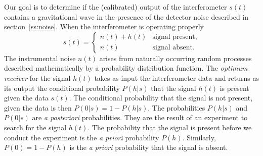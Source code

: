 Our goal is to determine if the (calibrated) output of the interferometer
$s(t)$ contains a gravitational wave in the presence of the detector noise
described in section~\ref{ss:noise}. When the interferometer is operating
properly
\begin{equation}
s(t) = \begin{cases}
n(t) + h(t) & \text{signal present},\\
n(t) & \text{signal absent}.
\end{cases}
\end{equation}
The instrumental noise $n(t)$ arises from naturally occurring random processes
described mathematically by a probability distribution function. The
\emph{optimum receiver} for the signal $h(t)$ takes as input the
interferometer data and returns as its output the conditional probability
$P(h|s)$ that the signal $h(t)$ is present given the data $s(t)$. The
conditional probability that the signal is not present, given the data is then
$P(0|s) = 1 - P(h|s)$. The probabilities $P(h|s)$ and $P(0|s)$ are \emph{a
posteriori} probabilities. They are the result of an experiment to
search for the signal $h(t)$. The probability that the
signal is present before we conduct the experiment is the \emph{a priori}
probability $P(h)$. Similarly, $P(0) = 1 - P(h)$ is the \emph{a priori}
probability that the signal is absent.

